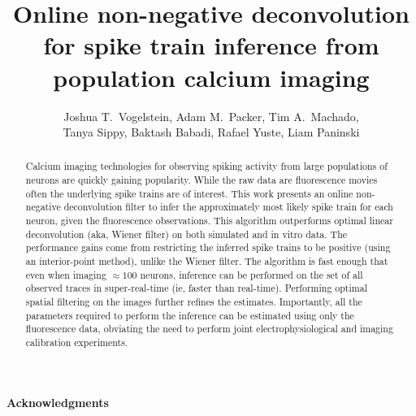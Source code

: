  
\usepackage{multicol}
\usepackage{hyperref}
\usepackage{algorithmic}
\usepackage{algorithm}
\newcommand{\zzz}{z}
\newcommand{\az}{\argmax_{\bM \bC \geq \ve{0}}}
\newcommand{\anx}{\argmax_{n_t \in \mathbb{N}_0 \forall t}}
\newcommand{\foopsi}{fast }


\title{Online non-negative deconvolution for spike train inference from population calcium imaging}

\author{Joshua T.~Vogelstein, Adam M.~Packer, Tim A.~Machado, \\ Tanya Sippy, Baktash Babadi, Rafael Yuste, Liam Paninski}



\maketitle
\begin{abstract}
Calcium imaging technologies for observing spiking activity from large populations of neurons are quickly gaining popularity.  While the raw data are fluorescence movies often the underlying spike trains are of interest.  This work presents an online non-negative deconvolution filter to infer the approximately most likely spike train for each neuron, given the fluorescence observations. This algorithm outperforms optimal linear deconvolution (aka, Wiener filter) on both simulated and in vitro data. The performance gains come from restricting the inferred spike trains to be positive (using an interior-point method), unlike the Wiener filter.  The algorithm is fast enough that even when  imaging $\approx 100$ neurons, inference can be performed on the set of all observed traces in super-real-time (ie, faster than real-time).  Performing optimal spatial filtering on the images further refines the estimates.  Importantly, all the parameters required to perform the inference can be estimated using only the fluorescence data, obviating the need to perform joint electrophysiological and imaging calibration experiments.
\end{abstract}



\paragraph{Acknowledgments}

